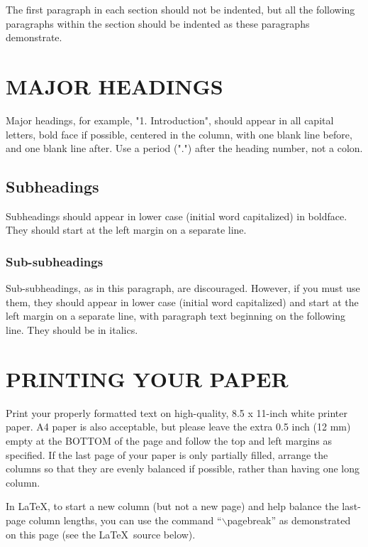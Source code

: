 \documentclass{article}
\begin{document}
The first paragraph in each section should not be indented, but all the
following paragraphs within the section should be indented as these paragraphs
demonstrate.

\section{MAJOR HEADINGS}
\label{sec:majhead}

Major headings, for example, "1. Introduction", should appear in all capital
letters, bold face if possible, centered in the column, with one blank line
before, and one blank line after. Use a period (".") after the heading number,
not a colon.

\subsection{Subheadings}
\label{ssec:subhead}

Subheadings should appear in lower case (initial word capitalized) in
boldface.  They should start at the left margin on a separate line.
 
\subsubsection{Sub-subheadings}
\label{sssec:subsubhead}

Sub-subheadings, as in this paragraph, are discouraged. However, if you
must use them, they should appear in lower case (initial word
capitalized) and start at the left margin on a separate line, with paragraph
text beginning on the following line.  They should be in italics.

\section{PRINTING YOUR PAPER}
\label{sec:print}

Print your properly formatted text on high-quality, 8.5 x 11-inch white printer
paper. A4 paper is also acceptable, but please leave the extra 0.5 inch (12 mm)
empty at the BOTTOM of the page and follow the top and left margins as
specified.  If the last page of your paper is only partially filled, arrange
the columns so that they are evenly balanced if possible, rather than having
one long column.

In \LaTeX, to start a new column (but not a new page) and help balance the
last-page column lengths, you can use the command ``$\backslash$pagebreak'' as
demonstrated on this page (see the \LaTeX\ source below).
\end{document}
